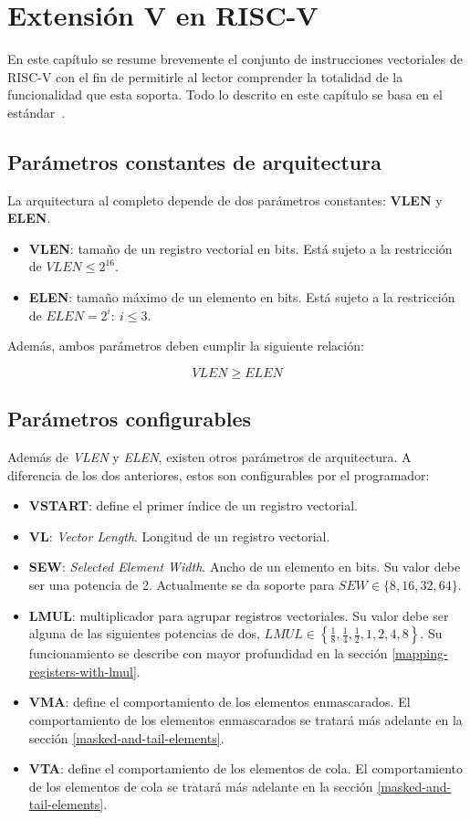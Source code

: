 \chapter{Extensión V en RISC-V}\label{chap:v-extenssion}

En este capítulo se resume brevemente el conjunto de instrucciones vectoriales
de RISC-V con el fin de permitirle al lector comprender la totalidad de la
funcionalidad que esta soporta. Todo lo descrito en este capítulo se basa en el estándar~\cite{riscv-isa2024}.

\section{Parámetros constantes de arquitectura}

La arquitectura al completo depende de dos parámetros constantes: \textbf{VLEN} y \textbf{ELEN}.
\begin{itemize}
    \item \textbf{VLEN}: tamaño de un registro vectorial en bits. Está sujeto a la restricción de $VLEN \le 2^{16}$.
    \item \textbf{ELEN}: tamaño máximo de un elemento en bits. Está sujeto a la restricción de $ELEN = 2^i:\ i\le 3$.
\end{itemize}

Además, ambos parámetros deben cumplir la siguiente relación:

$$VLEN \ge ELEN$$

\section{Parámetros configurables}\label{conf-parameters}

Además de \textit{VLEN} y \textit{ELEN}, existen otros parámetros de arquitectura. A diferencia de los dos anteriores, estos son configurables por el programador:
\begin{itemize}
    \item\textbf{VSTART}: define el primer índice de un registro vectorial.
    \item\textbf{VL}: \textit{Vector Length}. Longitud de un registro vectorial.
    \item\textbf{SEW}: \textit{Selected Element Width}. Ancho de un elemento en bits. Su valor debe ser una potencia de 2. Actualmente se da soporte para $SEW\in \{8, 16, 32, 64\}$.
    \item\textbf{LMUL}: multiplicador para agrupar registros vectoriales. Su valor debe ser alguna de las siguientes potencias de dos, $LMUL \in \left\{\frac18,\frac14,\frac12, 1, 2, 4, 8\right\}$. Su funcionamiento se describe con mayor profundidad en la sección \ref{mapping-registers-with-lmul}.
    \item\textbf{VMA}: define el comportamiento de los elementos enmascarados. El comportamiento de los elementos enmascarados se tratará más adelante en la sección \ref{masked-and-tail-elements}.
    \item\textbf{VTA}: define el comportamiento de los elementos de cola. El comportamiento de los elementos de cola se tratará más adelante en la sección \ref{masked-and-tail-elements}.
\end{itemize}

